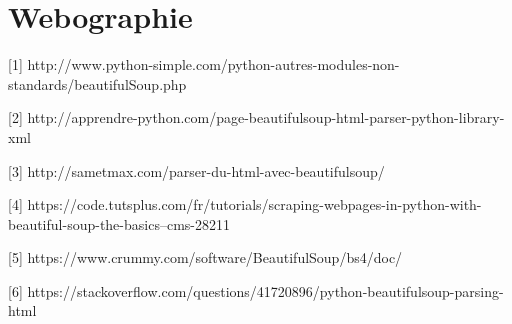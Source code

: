 \documentclass[12pt,twoside]{book}
\begin{document}
\chapter*{Webographie}
\begin{description}
\item{[1]} http://www.python-simple.com/python-autres-modules-non-standards/beautifulSoup.php
\item{[2]} http://apprendre-python.com/page-beautifulsoup-html-parser-python-library-xml
\item{[3]} http://sametmax.com/parser-du-html-avec-beautifulsoup/
\item{[4]} https://code.tutsplus.com/fr/tutorials/scraping-webpages-in-python-with-beautiful-soup-the-basics--cms-28211
\item{[5]} https://www.crummy.com/software/BeautifulSoup/bs4/doc/
\item{[6]} https://stackoverflow.com/questions/41720896/python-beautifulsoup-parsing-html


\end{description}
\end{document}
